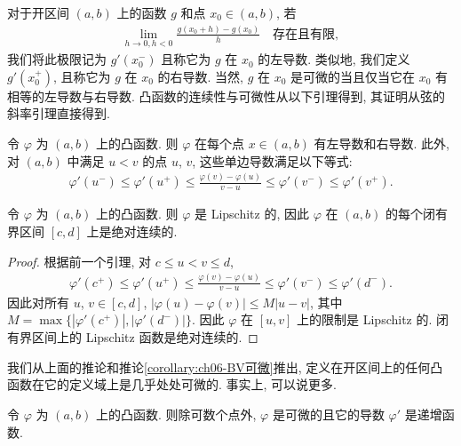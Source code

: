 \documentclass[../../main.tex]{subfiles}
\begin{document}
对于开区间 $(a,b)$ 上的函数 $g$ 和点 $x_{0}\in(a,b)$, 若
\begin{align*}
\lim_{h\to 0,h<0}\frac{g(x_{0}+h)-g(x_{0})}{h}\quad\text{存在且有限},
\end{align*}
我们将此极限记为 $g'(x_{0}^{-})$ 且称它为 $g$ 在 $x_{0}$ 的左导数. 类似地, 我们定义 $g'(x_{0}^{+})$, 且称它为 $g$ 在 $x_{0}$ 的右导数. 当然, $g$ 在 $x_{0}$ 是可微的当且仅当它在 $x_{0}$ 有相等的左导数与右导数. 凸函数的连续性与可微性从以下引理得到, 其证明从弦的斜率引理直接得到.

\begin{lemma}\label{lemma:ch06-单边导数}
令 $\varphi$ 为 $(a,b)$ 上的凸函数. 则 $\varphi$ 在每个点 $x\in(a,b)$ 有左导数和右导数. 此外, 对 $(a,b)$ 中满足 $u<v$ 的点 $u$, $v$, 这些单边导数满足以下等式:
\begin{align}
\varphi'(u^{-})\leqslant\varphi'(u^{+})\leqslant\frac{\varphi(v)-\varphi(u)}{v-u}\leqslant\varphi'(v^{-})\leqslant\varphi'(v^{+}).\label{align:ch06-单边导数}
\end{align}
\end{lemma}

\begin{corollary}\label{corollary:ch06-凸Lipschitz}
令 $\varphi$ 为 $(a,b)$ 上的凸函数. 则 $\varphi$ 是 Lipschitz 的, 因此 $\varphi$ 在 $(a,b)$ 的每个闭有界区间 $[c,d]$ 上是绝对连续的.
\end{corollary}

\begin{proof}
根据前一个引理, 对 $c\leqslant u<v\leqslant d$,
\begin{align}
\varphi'(c^{+})\leqslant\varphi'(u^{+})\leqslant\frac{\varphi(v)-\varphi(u)}{v-u}\leqslant\varphi'(v^{-})\leqslant\varphi'(d^{-}).\label{align:ch06-Lipschitz估计}
\end{align}
因此对所有 $u$, $v\in[c,d]$, $|\varphi(u)-\varphi(v)|\leqslant M|u-v|$, 其中 $M=\max\{|\varphi'(c^{+})|,|\varphi'(d^{-})|\}$. 因此 $\varphi$ 在 $[u,v]$ 上的限制是 Lipschitz 的. 闭有界区间上的 Lipschitz 函数是绝对连续的.
\end{proof}

我们从上面的推论和推论\cref{corollary:ch06-BV可微}推出, 定义在开区间上的任何凸函数在它的定义域上是几乎处处可微的. 事实上, 可以说更多.

\begin{theorem}\label{theorem:ch06-凸可微}
令 $\varphi$ 为 $(a,b)$ 上的凸函数. 则除可数个点外, $\varphi$ 是可微的且它的导数 $\varphi'$ 是递增函数.
\end{theorem}
\end{document}
